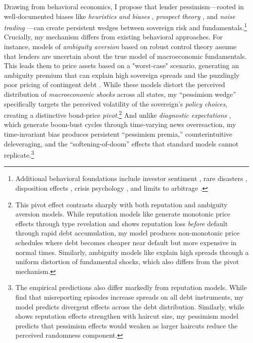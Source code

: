 \documentclass[12pt]{article}
\theoremstyle{plain}
\begin{document}
Drawing from behavioral economics, I propose that lender pessimism---rooted in
well-documented biases like \textit{heuristics and biases}
\citep{TverskyKahneman1974}, \textit{prospect theory}
\citep{KahnemanTversky1979}, and \textit{noise trading}
\citep{DeLongEtAl1990}---can create persistent wedges between sovereign risk
and fundamentals.\footnote{Additional behavioral foundations include investor
	sentiment \citep{BakerWurgler2006}, rare disasters \citep{Gabaix2012},
	disposition effects \citep{ShefrinStatman1985}, crisis psychology
	\citep{Kindleberger1978}, and limits to arbitrage \citep{BrunnermeierNagel2004,
		BarberisThaler2003}.} Crucially, my mechanism differs from existing behavioral
approaches. For instance, models of \textit{ambiguity aversion} based on robust
control theory \citep{GilboaSchmeidler1989, HansenSargent2008} assume that
lenders are uncertain about the true model of macroeconomic fundamentals. This
leads them to price assets based on a "worst-case" scenario, generating an
ambiguity premium that can explain high sovereign spreads
\citep{PouzoPresno2016} and the puzzlingly poor pricing of contingent debt
\citep{RochRoldan2023}. While these models distort the perceived distribution
of \textit{macroeconomic shocks} across all states, my ``pessimism wedge''
specifically targets the perceived volatility of the sovereign's \textit{policy
	choices}, creating a distinctive bond-price \textit{pivot}.\footnote{This pivot
	effect contrasts sharply with both reputation and ambiguity aversion models.
	While reputation models like \citep{AmadorPhelan2021} generate monotonic price
	effects through type revelation and \citep{Fourakis2021} shows reputation loss
	\textit{before} default through rapid debt accumulation, my model produces
	non-monotonic price schedules where debt becomes cheaper near default but more
	expensive in normal times. Similarly, ambiguity models like
	\citep{RochRoldan2023} explain high spreads through a uniform distortion of
	fundamental shocks, which also differs from the pivot mechanism.} And unlike
\textit{diagnostic expectations} \citep{GennaioliShleifer2018,
	BordaloEtAl2023}, which generate boom-bust cycles through time-varying news
overreaction, my time-invariant bias produces persistent ``pessimism premia,''
counterintuitive deleveraging, and the ``softening-of-doom'' effects that
standard models cannot replicate.\footnote{The empirical predictions also
	differ markedly from reputation models. While \citep{MorelliMoretti2023} find
	that misreporting episodes increase spreads on all debt instruments, my model
	predicts divergent effects across the debt distribution. Similarly, while
	\citep{AmadorPhelan2023} shows reputation effects strengthen with haircut size,
	my pessimism model predicts that pessimism effects would weaken as larger
	haircuts reduce the perceived randomness component.}
\end{document}
